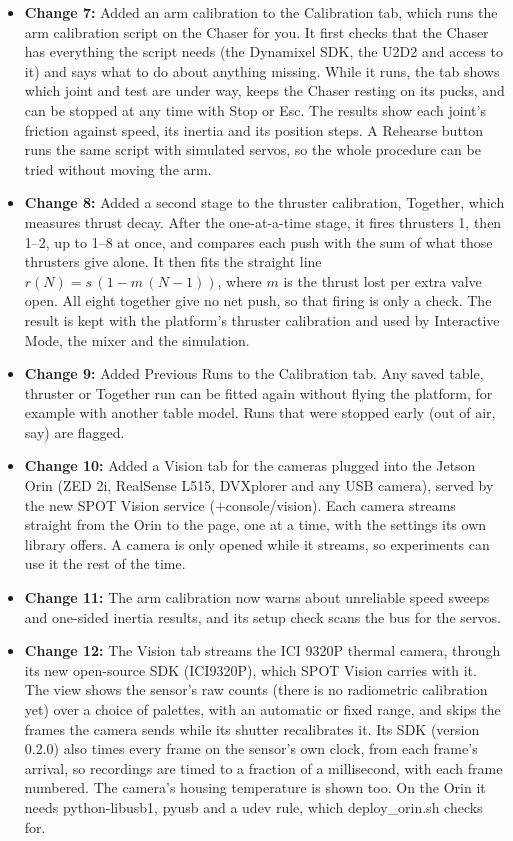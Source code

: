 \documentclass[11pt]{article}
\begin{document}
\begin{itemize}[label={\textcolor{primaryColor}{\textbullet}}]
    \item \textbf{Change 7:} Added an arm calibration to the Calibration tab, which runs the arm calibration script on the Chaser for you. It first checks that the Chaser has everything the script needs (the Dynamixel SDK, the U2D2 and access to it) and says what to do about anything missing. While it runs, the tab shows which joint and test are under way, keeps the Chaser resting on its pucks, and can be stopped at any time with Stop or Esc. The results show each joint's friction against speed, its inertia and its position steps. A Rehearse button runs the same script with simulated servos, so the whole procedure can be tried without moving the arm.
    \item \textbf{Change 8:} Added a second stage to the thruster calibration, Together, which measures thrust decay. After the one-at-a-time stage, it fires thrusters 1, then 1--2, up to 1--8 at once, and compares each push with the sum of what those thrusters give alone. It then fits the straight line $r(N) = s\,(1 - m\,(N-1))$, where $m$ is the thrust lost per extra valve open. All eight together give no net push, so that firing is only a check. The result is kept with the platform's thruster calibration and used by Interactive Mode, the mixer and the simulation.
    \item \textbf{Change 9:} Added Previous Runs to the Calibration tab. Any saved table, thruster or Together run can be fitted again without flying the platform, for example with another table model. Runs that were stopped early (out of air, say) are flagged.
    \item \textbf{Change 10:} Added a Vision tab for the cameras plugged into the Jetson Orin (ZED 2i, RealSense L515, DVXplorer and any USB camera), served by the new SPOT Vision service (+console/vision). Each camera streams straight from the Orin to the page, one at a time, with the settings its own library offers. A camera is only opened while it streams, so experiments can use it the rest of the time.
    \item \textbf{Change 11:} The arm calibration now warns about unreliable speed sweeps and one-sided inertia results, and its setup check scans the bus for the servos.
    \item \textbf{Change 12:} The Vision tab streams the ICI 9320P thermal camera, through its new open-source SDK (ICI9320P), which SPOT Vision carries with it. The view shows the sensor's raw counts (there is no radiometric calibration yet) over a choice of palettes, with an automatic or fixed range, and skips the frames the camera sends while its shutter recalibrates it. Its SDK (version 0.2.0) also times every frame on the sensor's own clock, from each frame's arrival, so recordings are timed to a fraction of a millisecond, with each frame numbered. The camera's housing temperature is shown too. On the Orin it needs python-libusb1, pyusb and a udev rule, which deploy\_orin.sh checks for.

\end{itemize}
\end{document}
